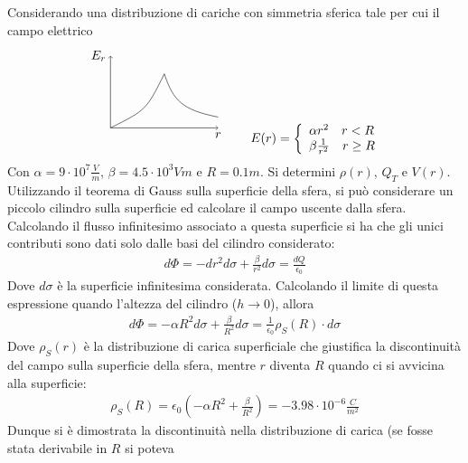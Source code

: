 \documentclass[a4paper, oneside]{article}
\begin{document}
\begin{example}
    Considerando una distribuzione di cariche con simmetria sferica tale per cui 
    il campo elettrico
    \begin{gather*}
        \begin{tikzpicture}
            \draw[->](0, 0) -- (3, 0) node[at end, below] {$r$};
            \draw[->](0, 0) -- (0, 2) node[at end, left] {$E_r$};
            \draw(0, 0) .. controls ( 1, 0.5) .. (1.5, 1.5) .. controls (1.75, 0.75) and (2, 0.5) .. (3, 0.3);
        \end{tikzpicture} \qquad E(r) = \left\{\begin{array}{l}
            \alpha r^{2} \quad r < R \\
            \beta \frac{1}{r^{2}} \quad r \geq R
        \end{array}\right.
    \end{gather*} 
    Con $\alpha = 9 \cdot 10^{7} \frac{V}{m}$, $\beta = 4.5 \cdot 10^{3} Vm$ e $R = 0.1 m$. Si determini 
    $\rho(r)$, $Q_{T}$ e $V(r)$. \\
    Utilizzando il teorema di Gauss sulla superficie della sfera, si può considerare
    un piccolo cilindro sulla superficie ed calcolare il campo uscente dalla sfera. 
    Calcolando il flusso infinitesimo associato a questa superficie si ha che gli unici 
    contributi sono dati solo dalle basi del cilindro considerato:
    \begin{gather*}
        d\Phi = -dr^{2} d\sigma + \frac{\beta}{r^{2}}d\sigma = \frac{dQ}{\epsilon_0}
    \end{gather*}
    Dove $d\sigma$ è la superficie infinitesima considerata. Calcolando il limite di questa
    espressione quando l'altezza del cilindro ($h \to 0$), allora 
    \begin{gather*}
        d\Phi = -\alpha R^{2} d\sigma + \frac{\beta}{R^{2}} d\sigma = \frac{1}{\epsilon_0} \rho_S(R) \cdot d\sigma
    \end{gather*}
    Dove $\rho_S(r)$ è la distribuzione di carica superficiale che giustifica
    la discontinuità del campo sulla superficie della sfera, mentre $r$ diventa $R$ quando 
    ci si avvicina alla superficie:
    \begin{gather*}
        \rho_S(R) = \epsilon_0 \left(-\alpha R^{2} + \frac{\beta}{R^{2}}\right) = -3.98 \cdot 10^{-6} \frac{C}{m^{2}}
    \end{gather*}
    Dunque si è dimostrata la discontinuità nella distribuzione di carica (se fosse stata derivabile in $R$ si poteva

\end{example}
\end{document}
